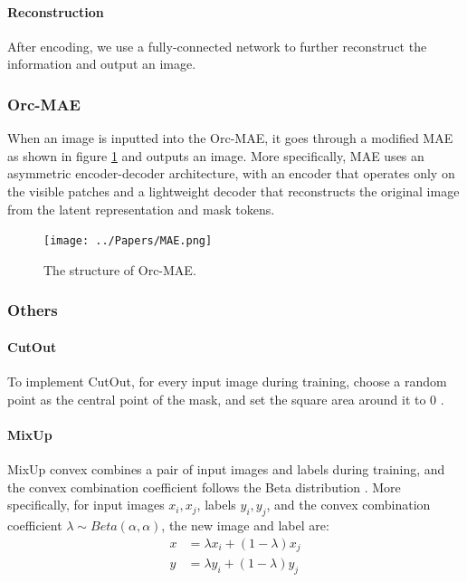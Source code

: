 \documentclass{article}
\begin{document}
\paragraph{Reconstruction}
After encoding, we use a fully-connected network to further reconstruct the information and output an image.

\subsubsection{Orc-MAE}

When an image is inputted into the Orc-MAE, it goes through a modified MAE as shown in figure \ref{fig:MAE} and outputs an image. More specifically, MAE uses an asymmetric encoder-decoder architecture, with an encoder that operates only on the visible  patches and a lightweight decoder that reconstructs the original image from the latent representation and mask tokens.  

\begin{figure}[h]
	\centering
	\texttt{[image: ../Papers/MAE.png]}
	\caption{The structure of Orc-MAE.}
	\label{fig:MAE}
\end{figure}

\subsubsection{Others}

\paragraph{CutOut}
To implement CutOut, for every input image during training, choose a random point as the central point of the mask, and set the square area around it to 0 \citep{CutOut}.

\paragraph{MixUp}
MixUp convex combines a pair of input images and labels during training, and the convex combination coefficient follows the Beta distribution \citep{MixUp}. More specifically, for input images $x_i, x_j$, labels $y_i, y_j$, and the convex combination coefficient $\lambda \sim Beta(\alpha, \alpha)$, the new image and label are:
\begin{align*}
	x &= \lambda x_i + (1 - \lambda) x_j \\
	y &= \lambda y_i + (1 - \lambda) y_j
\end{align*}
\end{document}
